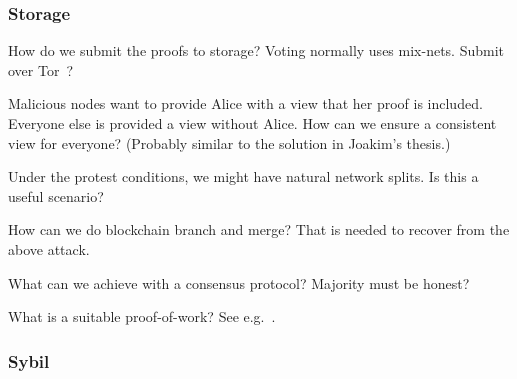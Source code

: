 \subsubsection{Storage}

\begin{frame}
  \begin{question}
    How do we submit the proofs to storage?
    Voting normally uses mix-nets.
    Submit over Tor~\cite{Tor}?
  \end{question}

\end{frame}

\begin{frame}
  \begin{question}
    Malicious nodes want to provide Alice with a view that her proof is 
    included.
    Everyone else is provided a view without Alice.
    How can we ensure a consistent view for everyone?
    (Probably similar to the solution in Joakim's thesis.)
  \end{question}

  \begin{question}
    Under the protest conditions, we might have natural network splits.
    Is this a useful scenario?
  \end{question}

  \begin{question}
    How can we do blockchain branch and merge?
    That is needed to recover from the above attack.
  \end{question}
\end{frame}

\begin{frame}
  \begin{question}
    What can we achieve with a consensus protocol?
    Majority must be honest?
  \end{question}
  \begin{question}
    What is a suitable proof-of-work?
    See e.g.~\cite{FairProofOfWork}.
  \end{question}
\end{frame}

\subsubsection{Sybil}

